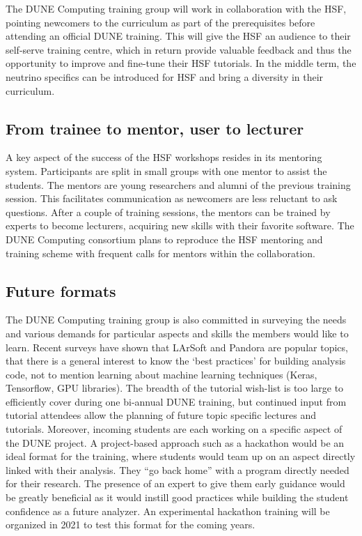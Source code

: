 The DUNE Computing training group will work in collaboration with the HSF, pointing newcomers to the curriculum as part of the prerequisites before attending an official DUNE training. This will give the HSF an audience to their self-serve training centre, which in return provide valuable feedback and thus the opportunity to improve and fine-tune their HSF tutorials. In the middle term, the neutrino specifics can be introduced for HSF and bring a diversity in their curriculum.

\subsection{From trainee to mentor, user to lecturer}
A key aspect of the success of the HSF workshops resides in its mentoring system. Participants are split in small groups with one mentor to assist the students. The mentors are young researchers and alumni of the previous training session. This facilitates communication as newcomers are less reluctant to ask questions. After a couple of training sessions, the mentors can be trained by experts to become lecturers, acquiring new skills with their favorite software. The DUNE Computing consortium plans to reproduce the HSF mentoring and training scheme with frequent calls for mentors within the collaboration.

\subsection{Future formats}
The DUNE Computing training group is also committed in surveying the needs and various demands for particular aspects and skills the members would like to learn. Recent surveys have shown that LArSoft and Pandora are popular topics, that there is a general interest to know the ‘best practices’ for building analysis code, not to mention learning about machine learning techniques (Keras, Tensorflow, GPU libraries). The breadth of the tutorial wish-list is too large to efficiently cover during one bi-annual DUNE training, but continued input from tutorial attendees allow the planning of future topic specific lectures and tutorials. Moreover, incoming students are each working on a specific aspect of the DUNE project. A project-based approach such as a hackathon would be an ideal format for the training, where students would team up on an aspect directly linked with their analysis. They “go back home” with a program directly needed for their research. The presence of an expert to give them early guidance would be greatly beneficial as it would instill good practices while building the student confidence as a future analyzer. An experimental hackathon training will be organized in 2021 to test this format for the coming years.



